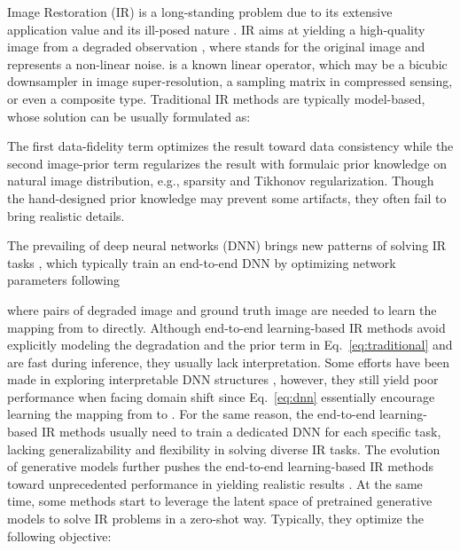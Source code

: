 \documentclass{article} \usepackage{iclr2023_conference,times}
\begin{document}
\def\thefootnote{*}
\vspace{-0.2cm}

Image Restoration (IR) is a long-standing problem due to its extensive application value and its ill-posed nature \citep{richardson1972bayesian,andrews1977digital}. IR aims at yielding a high-quality image  from a degraded observation , where  stands for the original image and  represents a non-linear noise.  is a known linear operator, which may be a bicubic downsampler in image super-resolution, a sampling matrix in compressed sensing, or even a composite type. Traditional IR methods are typically model-based, whose solution can be usually formulated as:

The first data-fidelity term  optimizes the result toward data consistency while the second image-prior term  regularizes the result with formulaic prior knowledge on natural image distribution, e.g., sparsity and Tikhonov regularization. Though the hand-designed prior knowledge may prevent some artifacts, they often fail to bring realistic details. 

The prevailing of deep neural networks (DNN) brings new patterns of solving IR tasks \citep{srcnn}, which typically train an end-to-end DNN  by optimizing network parameters  following 

where  pairs of degraded image  and ground truth image  are needed to learn the mapping from  to  directly. Although end-to-end learning-based IR methods avoid explicitly modeling the degradation  and the prior term in Eq.~\ref{eq:traditional} and are fast during inference, they usually lack interpretation. Some efforts have been made in exploring interpretable DNN structures \citep{zhang2018ista,zhang2020dunsr}, however, they still yield poor performance when facing domain shift since Eq.~\ref{eq:dnn} essentially encourage learning the mapping from  to . For the same reason, the end-to-end learning-based IR methods usually need to train a dedicated DNN for each specific task, lacking generalizability and flexibility in solving diverse IR tasks. The evolution of generative models \citep{gan, kingma2014auto,vqvae,stylegan,stylegan2,stylegan3} further pushes the end-to-end learning-based IR methods toward unprecedented performance in yielding realistic results \citep{gpen,gfpgan,glean,panini}. At the same time, some methods \citep{menon2020pulse,pan2021exploiting} start to leverage the latent space of pretrained generative models to solve IR problems in a zero-shot way. Typically, they optimize the following objective: 
\end{document}
